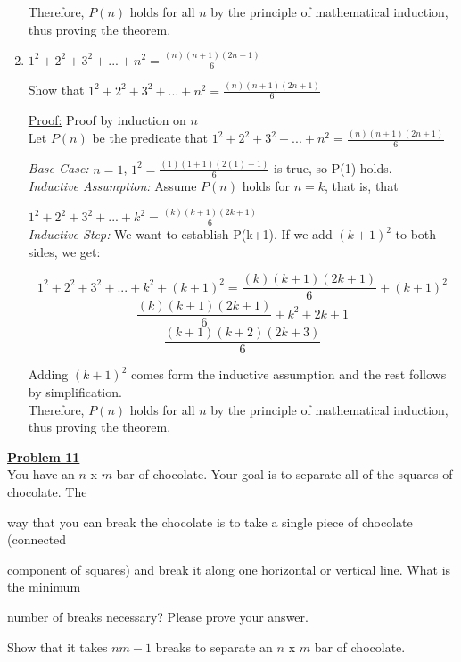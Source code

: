 \documentclass[11pt]{article}
\begin{document}
\begin{enumerate}
			Therefore, $P(n)$ holds for all $n$ by the principle of mathematical induction, thus proving the theorem.
	

		\item $1^2+2^2+3^2+...+n^2 = \frac{(n)(n+1)(2n+1)}{6}$

			Show that $1^2+2^2+3^2+...+n^2 = \frac{(n)(n+1)(2n+1)}{6}$

			\underline{Proof:} Proof by induction on $n$\\

			Let $P(n)$ be the predicate that $1^2+2^2+3^2+...+n^2 = \frac{(n)(n+1)(2n+1)}{6}$

			\textit{Base Case:} $n=1$, $1^2 = \frac{(1)(1+1)(2(1)+1)}{6}$ is true, so P(1) holds.\\
			\textit{Inductive Assumption:} Assume $P(n)$ holds for $n = k$, that is, that 

			$1^2+2^2+3^2+...+k^2 = \frac{(k)(k+1)(2k+1)}{6}$\\

			\textit{Inductive Step:} We want to establish P(k+1). If we add $(k+1)^2$ to both sides, we get:

			\[1^2+2^2+3^2+...+k^2+(k+1)^2 = \frac{(k)(k+1)(2k+1)}{6} + (k+1)^2\]
			\[\frac{(k)(k+1)(2k+1)}{6} + k^2+2k+1\]
			\[\frac{(k+1)(k+2)(2k+3)}{6}\]

			Adding $(k+1)^2$ comes form the inductive assumption and the rest follows by simplification. \\
	
			Therefore, $P(n)$ holds for all $n$ by the principle of mathematical induction, thus proving the theorem.	
	\end{enumerate}
\newpage
\noindent\textbf{\underline{Problem 11}}\\

	You have an $n$ x $m$ bar of chocolate. Your goal is to separate all of the squares of chocolate. The 

	way that you can break the chocolate is to take a single piece of chocolate (connected 

	component of squares) and break it along one horizontal or vertical line. What is the minimum 

	number of breaks necessary? Please prove your answer.

	Show that it takes $nm-1$ breaks to separate an $n$ x $m$ bar of chocolate.\\
\end{document}
